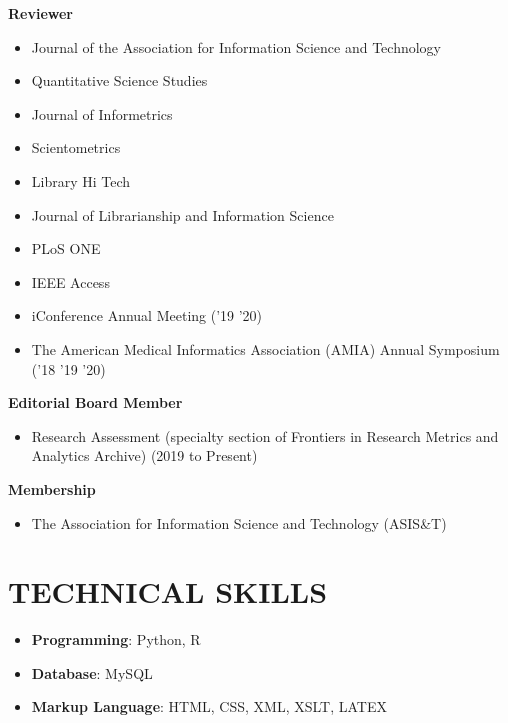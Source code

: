 \documentclass[margin, 10pt]{res} %
\begin{document}
\begin{resume}
\textbf{Reviewer}
\begin{itemize}
\item Journal of the Association for Information Science and Technology
\item Quantitative Science Studies
\item Journal of Informetrics
\item Scientometrics
\item Library Hi Tech
\item Journal of Librarianship and Information Science
\item PLoS ONE
\item IEEE Access
\item iConference Annual Meeting ('19 '20)
\item The American Medical Informatics Association (AMIA) Annual Symposium ('18 '19 '20)
\end{itemize}

\textbf{Editorial Board Member}
\begin{itemize}
\item Research Assessment (specialty section of Frontiers in Research Metrics and Analytics Archive) (2019 to Present)
\end{itemize}

\textbf{Membership}
\begin{itemize}
\item The Association for Information Science and Technology (ASIS\&T)
\end{itemize}

\section{TECHNICAL SKILLS}
\begin{itemize}
\item \textbf{Programming}: Python, R
\item \textbf{Database}: MySQL
\item \textbf{Markup Language}: HTML, CSS, XML, XSLT, LATEX
\end{itemize}



\end{resume}
\end{document}
